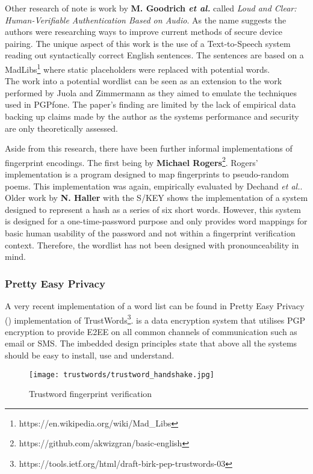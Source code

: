 Other research of note is work by \textbf{M. Goodrich \textit{et al.}}\cite{goodrich2006loud} called \textit{Loud and Clear: Human-Verifiable Authentication Based on Audio}. As the name suggests the authors were researching ways to improve current methods of secure device pairing. The unique aspect of this work is the use of a Text-to-Speech system reading out syntactically correct English sentences. The sentences are based on a MadLibs\footnote{https://en.wikipedia.org/wiki/Mad\_Libs} where static placeholders were replaced with potential words.\\
The work into a potential wordlist can be seen as an extension to the work performed by Juola and Zimmermann\cite{juola1996whole} as they aimed to emulate the techniques used in PGPfone. The paper's finding are limited by the lack of empirical data backing up claims made by the author as the systems performance and security are only theoretically assessed.

Aside from this research, there have been further informal implementations of fingerprint encodings. The first being by \textbf{Michael Rogers}\footnote{https://github.com/akwizgran/basic-english}. Rogers' implementation is a program designed to map fingerprints to pseudo-random poems. This implementation was again, empirically evaluated by Dechand \textit{et al.}\cite{dechand2016empirical}. Older work by \textbf{N. Haller} with the S/KEY\cite{haller1995s} shows the implementation of a system designed to represent a hash as a series of six short words. However, this system is designed for a one-time-password purpose and only provides word mappings for basic human usability of the password and not within a fingerprint verification context. Therefore, the wordlist has not been designed with pronounceability in mind.

\subsubsection{Pretty Easy Privacy}
A very recent implementation of a word list can be found in Pretty Easy Privacy (\pep) implementation of TrustWords\footnote{https://tools.ietf.org/html/draft-birk-pep-trustwords-03}. \pep is a data encryption system that utilises PGP encryption to provide E2EE on all common channels of communication such as email or SMS. The imbedded design principles state that above all the systems should be easy to install, use and understand.

\begin{wrapfigure}{r}{6cm}
    \centering
    \texttt{[image: trustwords/trustword\_handshake.jpg]}
    \caption{Trustword fingerprint verification}
    \label{fig:trustwords}
\end{wrapfigure}

